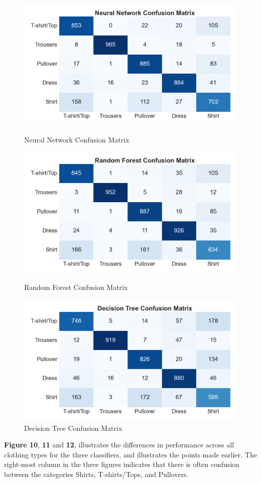 \begin{figure}[H]
  \includegraphics[width=\linewidth]{figures_for_report/Neural Network Confusion Matrix}
  \caption{Neural Network Confusion Matrix}\label{fig:nn_cm}
\endminipage\hfill
{}
  \includegraphics[width=\linewidth]{figures_for_report/Random Forest Confusion Matrix}
  \caption{Random Forest Confusion Matrix}\label{fig:rf_cm}
\endminipage\hfill
    \centering
  \includegraphics[width=\linewidth]{figures_for_report/Decision Tree Confusion Matrix}
  \caption{Decision Tree Confusion Matrix}\label{fig:dt_cm}
\endminipage\hfill
\end{figure}\label{fig:cfm}

\textbf{Figure 10}, \textbf{11} and \textbf{12}, illustrates the differences in performance across all clothing types for the three classifiers, and illustrates the points made earlier.
The right-most column in the three figures indicates that there is often confusion between the categories Shirts, T-shirts/Tops, and Pullovers.